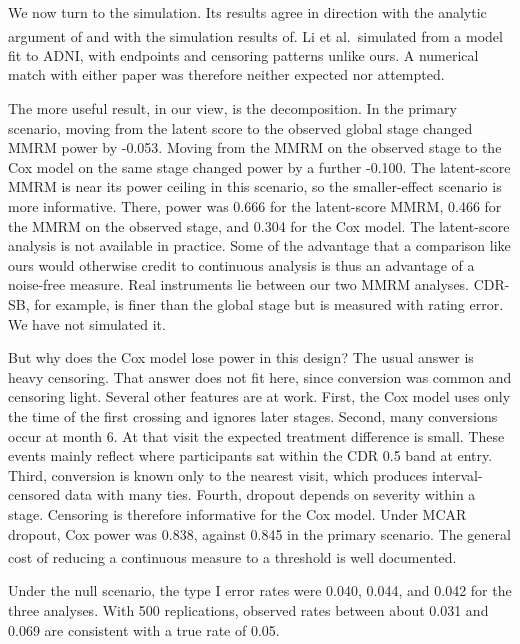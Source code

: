 \documentclass[
  11pt,
]{article}
\begin{document}
We now turn to the simulation. Its results agree in
direction with the analytic argument of\textsuperscript{} and with the simulation results of\textsuperscript{}. Li et al.~simulated from a model fit to
ADNI, with endpoints and censoring patterns unlike ours.
A numerical match with either paper was therefore neither
expected nor attempted.

The more useful result, in our view, is the decomposition.
In the primary scenario, moving from the latent score to
the observed global stage changed MMRM power by
-0.053. Moving from the MMRM on the observed
stage to the Cox model on the same stage changed power by
a further -0.100. The latent-score MMRM is near
its power ceiling in this scenario, so the smaller-effect
scenario is more informative. There, power was
0.666 for the latent-score MMRM,
0.466 for the MMRM on the observed stage, and
0.304 for the Cox model. The latent-score
analysis is not available in practice. Some of the
advantage that a comparison like ours would otherwise
credit to continuous analysis is thus an advantage of a
noise-free measure. Real instruments lie between our two
MMRM analyses. CDR-SB, for example, is finer than the
global stage but is measured with rating error. We have
not simulated it.

But why does the Cox model lose power in this design? The
usual answer is heavy censoring. That answer does not fit
here, since conversion was common and censoring light.
Several other features are at work. First, the Cox model
uses only the time of the first crossing and ignores later
stages. Second, many conversions occur at month 6. At that
visit the expected treatment difference is small. These
events mainly reflect where participants sat within the
CDR 0.5 band at entry. Third, conversion is known only
to the nearest visit, which produces interval-censored
data with many ties. Fourth, dropout depends on severity
within a stage. Censoring is therefore informative for the
Cox model. Under MCAR dropout, Cox power was
0.838, against 0.845 in the
primary scenario. The general cost of reducing a
continuous measure to a threshold is well documented\textsuperscript{}.

Under the null scenario, the type I error rates were
0.040,
0.044, and
0.042 for the three
analyses. With 500 replications, observed rates between
about 0.031 and 0.069 are consistent with a true rate of
0.05.
\end{document}
